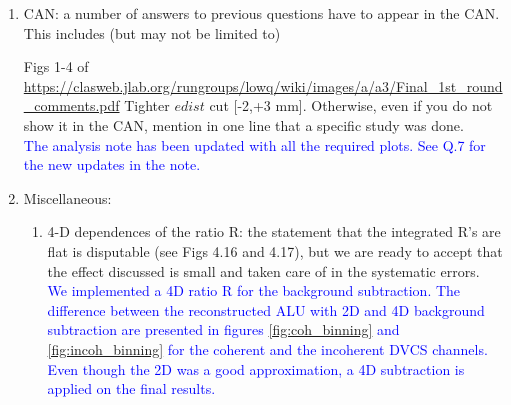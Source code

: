 \begin{enumerate}
\item CAN: a number of answers to previous questions have to appear in the CAN.  
This includes (but may not be limited to) 

Figs 1-4 of 
\url{https://clasweb.jlab.org/rungroups/lowq/wiki/images/a/a3/Final_1st_round_comments.pdf} 
Tighter $edist$ cut [-2,+3 mm]. Otherwise, even if you do not show it in the 
CAN, mention in one line that a specific study was done.\\
\textcolor{blue}{The analysis note has been updated with all the required 
plots. See Q.7 for the new updates in the note.}\\

\item Miscellaneous:
   \begin{enumerate}
      \item 4-D dependences of the ratio R: the statement that the integrated R's 
    are flat is disputable (see Figs 4.16 and 4.17), but we are ready to accept 
    that the effect discussed is small and taken care of in the systematic 
    errors.\\
    \textcolor{blue}{We implemented a 4D ratio R for the background 
       subtraction. The difference between the reconstructed ALU with 2D and 4D 
       background subtraction are presented in figures \ref{fig:coh_binning} 
       and \ref{fig:incoh_binning} for the coherent and the incoherent DVCS 
    channels. Even though the 2D was a good approximation, a 4D subtraction is 
 applied on the final results.} 
 

\end{enumerate}
\end{enumerate}
